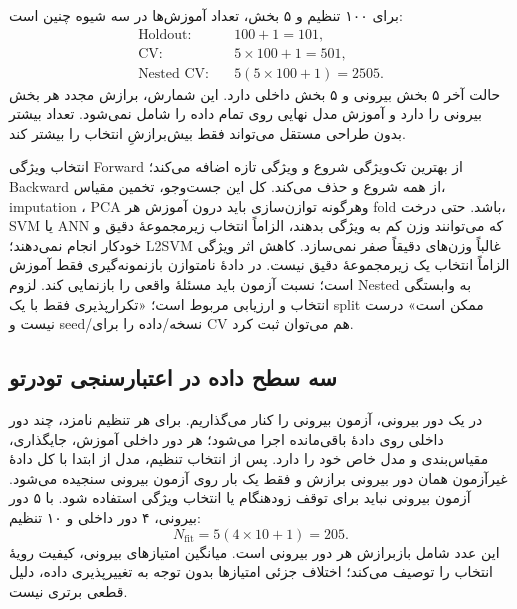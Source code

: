 برای ۱۰۰ تنظیم و ۵ بخش، تعداد آموزش‌ها در سه شیوه چنین است:
\begin{align*}
\text{Holdout}:&\quad100+1=101,\\
\text{CV}:&\quad5\times100+1=501,\\
\text{Nested CV}:&\quad5(5\times100+1)=2505.
\end{align*}
حالت آخر ۵ بخش بیرونی و ۵ بخش داخلی دارد. این شمارش، برازش مجدد هر بخش بیرونی را دارد و آموزش مدل نهایی روی تمام داده را شامل نمی‌شود. تعداد بیشتر بدون طراحی مستقل می‌تواند فقط بیش‌برازشِ انتخاب را بیشتر کند.

انتخاب ویژگی Forward از بهترین تک‌ویژگی شروع و ویژگی تازه اضافه می‌کند؛ Backward از همه شروع و حذف می‌کند. کل این جست‌وجو، تخمین مقیاس، imputation ، PCA وهرگونه توازن‌سازی باید درون آموزش هر fold باشد. حتی درخت، SVM یا ANN که می‌توانند وزن کم به ویژگی بدهند، الزاماً انتخاب زیرمجموعهٔ دقیق و خودکار انجام نمی‌دهند؛ L2SVM غالباً وزن‌های دقیقاً صفر نمی‌سازد. کاهش اثر ویژگی الزاماً انتخاب یک زیرمجموعهٔ دقیق نیست. در دادهٔ نامتوازن بازنمونه‌گیری فقط آموزش است؛ نسبت آزمون باید مسئلهٔ واقعی را بازنمایی کند. لزوم Nested به وابستگی انتخاب و ارزیابی مربوط است؛ «تکرارپذیری فقط با یک split ممکن است» درست نیست و seed/نسخه/داده را برای CV هم می‌توان ثبت کرد.



\subsection*{سه سطح داده در اعتبارسنجی تودرتو}
در یک دور بیرونی، آزمون بیرونی را کنار می‌گذاریم. برای هر تنظیم نامزد، چند دور داخلی روی دادهٔ باقی‌مانده اجرا می‌شود؛ هر دور داخلی آموزش، جایگذاری، مقیاس‌بندی و مدل خاص خود را دارد. پس از انتخاب تنظیم، مدل از ابتدا با کل دادهٔ غیرآزمون همان دور بیرونی برازش و فقط یک بار روی آزمون بیرونی سنجیده می‌شود. آزمون بیرونی نباید برای توقف زودهنگام یا انتخاب ویژگی استفاده شود. با ۵ دور بیرونی، ۴ دور داخلی و ۱۰ تنظیم:
\[N_{\mathrm{fit}}=5(4\times10+1)=205.\]
این عدد شامل بازبرازش هر دور بیرونی است. میانگین امتیازهای بیرونی، کیفیت رویهٔ انتخاب را توصیف می‌کند؛ اختلاف جزئی امتیازها بدون توجه به تغییرپذیری داده، دلیل قطعی برتری نیست.

